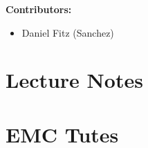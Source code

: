\documentclass[12pt, a4paper]{report}
\begin{document}
	\tableofcontents
	\vspace{2em}
	\textbf{Contributors:}
	\begin{itemize}
		\item Daniel Fitz (Sanchez)
	\end{itemize}
	\newpage

\begin{multicols*}{2}

\chapter{Lecture Notes}











\chapter{EMC Tutes}




\end{multicols*}

%
%

\end{document}
